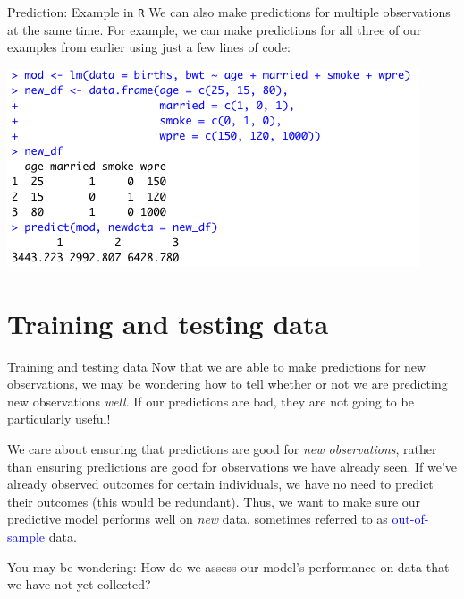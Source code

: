 \documentclass[10pt,t]{beamer}
\begin{document}
\begin{frame}{Prediction: Example in \texttt{R}}
We can also make predictions for multiple observations at the same time. For example, we can make predictions for all three of our examples from earlier using just a few lines of code:

\vspace{0.3cm}

\centering \includegraphics[scale=0.5]{figures/newdata_example2.png}

\end{frame}


\section{Training and testing data}

\begin{frame}{Training and testing data}
Now that we are able to make predictions for new observations, we may be wondering how to tell whether or not we are predicting new observations \textit{well}. If our predictions are bad, they are not going to be particularly useful!

\vspace{0.3cm}

We care about ensuring that predictions are good for \textit{new observations}, rather than ensuring predictions are good for observations we have already seen. If we've already observed outcomes for certain individuals, we have no need to predict their outcomes (this would be redundant). Thus, we want to make sure our predictive model performs well on \textit{new} data, sometimes referred to as \textcolor{blue}{out-of-sample} data.

\vspace{0.3cm}

You may be wondering: How do we assess our model's performance on data that we have not yet collected?
\end{frame}
\end{document}
